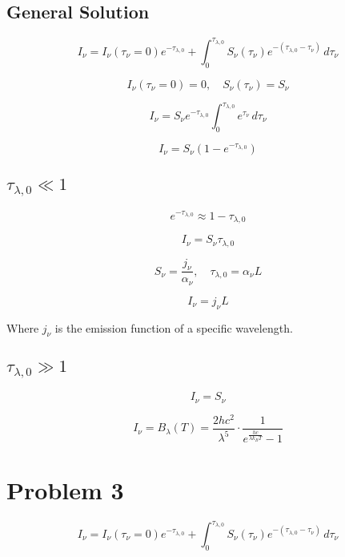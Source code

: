 \documentclass[12pt]{article}
\begin{document}
\subsection{General Solution}



\[
    I_\nu = I_\nu(\tau_\nu=0) e^{-\tau_{\lambda,0}} + \int_{0}^{\tau_{\lambda,0}} S_\nu(\tau_\nu) e^{-(\tau_{\lambda,0} - \tau_\nu)} \, d\tau_\nu
\]

\[
    I_\nu(\tau_\nu=0) = 0,\quad S_\nu(\tau_\nu) = S_\nu
\]

\[
    I_\nu = S_\nu e^{-\tau_{\lambda,0}} \int_{0}^{\tau_{\lambda,0}} e^{\tau_\nu} \, d\tau_\nu
\]

\[
    I_\nu = S_\nu (1 - e^{-\tau_{\lambda,0}})
\]


\subsection{$\tau_{\lambda,0} \ll 1$}

\[
    e^{-\tau_{\lambda,0}} \approx 1 - \tau_{\lambda,0}
\]

\[
    I_\nu = S_\nu \tau_{\lambda,0}
\]

\[
    S_\nu = \frac{j_\nu}{\alpha_\nu},\quad \tau_{\lambda,0} = \alpha_\nu L
\]

\[
    I_\nu = j_\nu L
\]

Where $j_\nu$ is the emission function of a specific wavelength.

\subsection{$\tau_{\lambda,0} \gg 1$}

\[
    I_\nu = S_\nu
\]

\[
    I_\nu = B_\lambda(T) = \frac{2 h c^2}{\lambda^5} \cdot \frac{1}{e^{\frac{h c}{\lambda k_B T}} - 1}
\]

\newpage

\section{Problem 3}

\[
    I_\nu = I_\nu(\tau_\nu=0) e^{-\tau_{\lambda,0}} + \int_{0}^{\tau_{\lambda,0}} S_\nu(\tau_\nu) e^{-(\tau_{\lambda,0} - \tau_\nu)} \, d\tau_\nu
\]
\end{document}
